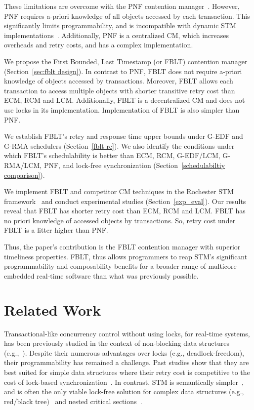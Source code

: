 \documentclass[prodmode,acmtecs]{acmsmall}
\begin{document}
These limitations are overcome with the PNF contention manager~\cite{shambake_phd_proposal}. However, PNF requires a-priori knowledge of all objects accessed by each transaction. This significantly limits programmability, and is incompatible with dynamic STM implementations~\cite{Herlihy:2003:STM:872035.872048}. Additionally, PNF is a centralized CM, which increases overheads and retry costs, and has a complex implementation. 

We propose the First Bounded, Last Timestamp (or FBLT) contention manager (Section~\ref{sec:fblt design}). In contrast to PNF, FBLT does not require a-priori knowledge of objects accessed by transactions. Moreover, FBLT allows each transaction to access multiple objects with shorter transitive retry cost than ECM, RCM and LCM. Additionally, FBLT is a decentralized CM and does not use locks in its implementation. Implementation of FBLT is also simpler than PNF. 

We establish FBLT's retry and response time upper bounds under G-EDF and G-RMA schedulers (Section~\ref{fblt rc}). We also identify the conditions under which FBLT's schedulability is better than ECM, RCM, G-EDF/LCM, G-RMA/LCM, PNF, and lock-free synchronization (Section~\ref{schedulabiltiy comparison}).

We implement FBLT and competitor CM techniques in the Rochester STM framework~\cite{marathe2006lowering} and conduct experimental studies (Section~\ref{exp_eval}). Our results reveal that FBLT has shorter retry cost than ECM, RCM and LCM. FBLT has no priori knowledge of accessed objects by transactions. So, retry cost under FBLT is a litter higher than PNF.

Thus, the paper's contribution is the FBLT contention manager with superior timeliness properties. FBLT, thus allows programmers to reap STM's significant programmability and composability benefits for a broader range of multicore embedded real-time software than what was previously possible.

\section{Related Work}
\label{sec:past}

Transactional-like concurrency control without using locks, for real-time systems, has been previously studied in the context of non-blocking data structures (e.g.,~\cite{anderson95realtime}). Despite their numerous advantages over locks 
(e.g., deadlock-freedom), 
their programmability has remained a challenge. 
Past studies show that they are best suited for simple data structures where their retry cost is competitive to the cost of lock-based synchronization~\cite{bc+08}.  In contrast, STM is semantically simpler~\cite{Herlihy:2006:AMP:1146381.1146382}, and is often the only viable lock-free solution for complex data structures (e.g., red/black tree)~\cite{key-1} and nested critical sections~\cite{Saha:2006:MHP:1122971.1123001}.
\end{document}
